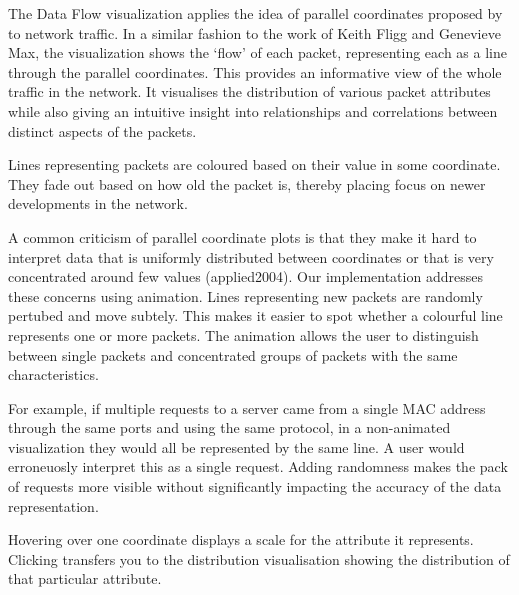 The Data Flow visualization applies the idea of parallel coordinates proposed by \cite{inselberg1985plane} to network traffic. In a similar fashion to the work of Keith Fligg and Genevieve Max, the visualization shows the `flow' of each packet, representing each as a line through the parallel coordinates. This provides an informative view of the whole traffic in the network. It visualises the distribution of various packet attributes while also giving an intuitive insight into relationships and correlations between distinct aspects of the packets.

Lines representing packets are coloured based on their value in some coordinate. They fade out based on how old the packet is, thereby placing focus on newer developments in the network. 

A common criticism of parallel coordinate plots is that they make it hard to interpret data that is uniformly distributed between coordinates or that is very concentrated around few values (applied2004). Our implementation addresses these concerns using animation. Lines representing new packets are randomly pertubed and move subtely. This makes it easier to spot whether a colourful line represents one or more packets. The animation allows the user to distinguish between single packets and concentrated groups of packets with the same characteristics.

For example, if multiple requests to a server came from a single MAC address through the same ports and using the same protocol, in a non-animated visualization they would all be represented by the same line. A user would erroneuosly interpret this as a single request. Adding randomness makes the pack of requests more visible without significantly impacting the accuracy of the data representation.

Hovering over one coordinate displays a scale for the attribute it represents. Clicking transfers you to the distribution visualisation showing the distribution of that particular attribute.

